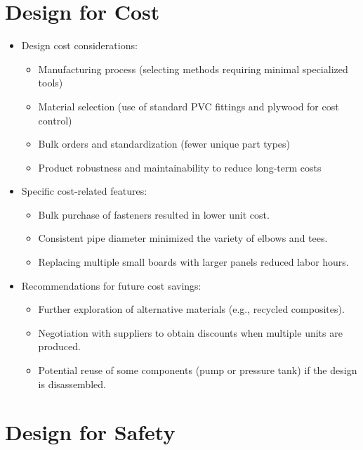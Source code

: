 \documentclass[12pt]{report}
\begin{document}
\section{Design for Cost}
\begin{itemize}[leftmargin=1.5cm]
    \item Design cost considerations:
    \begin{itemize}
        \item Manufacturing process (selecting methods requiring minimal specialized tools)
        \item Material selection (use of standard PVC fittings and plywood for cost control)
        \item Bulk orders and standardization (fewer unique part types)
        \item Product robustness and maintainability to reduce long-term costs
    \end{itemize}
    \item Specific cost-related features:
    \begin{itemize}
        \item Bulk purchase of fasteners resulted in lower unit cost.
        \item Consistent pipe diameter minimized the variety of elbows and tees.
        \item Replacing multiple small boards with larger panels reduced labor hours.
    \end{itemize}
    \item Recommendations for future cost savings:
    \begin{itemize}
        \item Further exploration of alternative materials (e.g., recycled composites).
        \item Negotiation with suppliers to obtain discounts when multiple units are produced.
        \item Potential reuse of some components (pump or pressure tank) if the design is disassembled.
    \end{itemize}
\end{itemize}

\section{Design for Safety}
\end{document}
